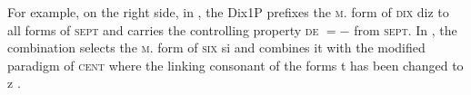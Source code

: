 \documentclass[output=paper]{langsci/langscibook}
\begin{document}
For example, on the right side, in , the Dix1P prefixes the \textsc{m}.\lplus{} form of \textsc{dix} diz %
 to all forms of \textsc{sept} and carries the controlling property \textsc{de} $= -$ from \textsc{sept}. In , the combination selects the \textsc{m}.\lmoins{} form of \textsc{six} si %
 and combines it with the modified paradigm  of \textsc{cent} where the linking consonant of the \lplus{} forms t %
 has been changed to z %
.
\ea
\begin{exe} 
 \begin{xlist}
\end{xlist}
\end{exe}
\end{document}
